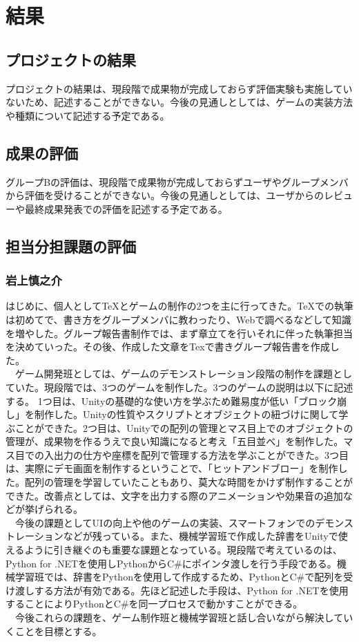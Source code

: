 \chapter{結果}
\section{プロジェクトの結果}
プロジェクトの結果は、現段階で成果物が完成しておらず評価実験も実施していないため、記述することができない。今後の見通しとしては、ゲームの実装方法や種類について記述する予定である。

\section{成果の評価}
グループBの評価は、現段階で成果物が完成しておらずユーザやグループメンバから評価を受けることができない。今後の見通しとしては、ユーザからのレビューや最終成果発表での評価を記述する予定である。


\newpage
\section{担当分担課題の評価}
\subsection{岩上慎之介}
はじめに、個人としてTeXとゲームの制作の2つを主に行ってきた。TeXでの執筆は初めてで、書き方をグループメンバに教わったり、Webで調べるなどして知識を増やした。グループ報告書制作では、まず章立てを行いそれに伴った執筆担当を決めていった。その後、作成した文章をTexで書きグループ報告書を作成した。\\
　ゲーム開発班としては、ゲームのデモンストレーション段階の制作を課題としていた。現段階では、3つのゲームを制作した。3つのゲームの説明は以下に記述する。
1つ目は、Unityの基礎的な使い方を学ぶため難易度が低い「ブロック崩し」を制作した。Unityの性質やスクリプトとオブジェクトの紐づけに関して学ぶことができた。2つ目は、Unityでの配列の管理とマス目上でのオブジェクトの管理が、成果物を作るうえで良い知識になると考え「五目並べ」を制作した。マス目での入出力の仕方や座標を配列で管理する方法を学ぶことができた。3つ目は、実際にデモ画面を制作するということで、「ヒットアンドブロー」を制作した。配列の管理を学習していたこともあり、莫大な時間をかけず制作することができた。改善点としては、文字を出力する際のアニメーションや効果音の追加などが挙げられる。\\
　今後の課題としてUIの向上や他のゲームの実装、スマートフォンでのデモンストレーションなどが残っている。また、機械学習班で作成した辞書をUnityで使えるように引き継ぐのも重要な課題となっている。現段階で考えているのは、Python for .NETを使用しPythonからC\#にポインタ渡しを行う手段である。機械学習班では、辞書をPythonを使用して作成するため、PythonとC\#で配列を受け渡しする方法が有効である。先ほど記述した手段は、Python for .NETを使用することによりPythonとC\#を同一プロセスで動かすことができる。\\
　今後これらの課題を、ゲーム制作班と機械学習班と話し合いながら解決していくことを目標とする。

